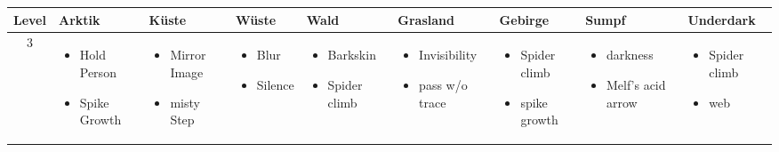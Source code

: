\clearpage
\begin{table}
	\centering
	\begin{tabular}{cp{3cm}p{3cm}p{3cm}p{3cm}p{3cm}p{3cm}p{3cm}p{3cm}}
	\textbf{Level} & \textbf{Arktik} & \textbf{Küste} & \textbf{Wüste} & \textbf{Wald} & \textbf{Grasland} & \textbf{Gebirge} & \textbf{Sumpf} & \textbf{Underdark} \\ \hline
	3 & 
	\begin{itemize}
		\item Hold Person
		\item Spike Growth
	\end{itemize}&
	\begin{itemize}
		\item Mirror Image
		\item misty Step 
	\end{itemize}& 
	\begin{itemize}
		\item Blur
		\item Silence
	\end{itemize}&
	\begin{itemize}
		\item Barkskin
		\item Spider climb
	\end{itemize}&
	\begin{itemize}
		\item Invisibility
		\item pass w/o trace
	\end{itemize}&
	\begin{itemize}
		\item Spider climb
		\item spike growth
	\end{itemize}&
	\begin{itemize}
		\item darkness
		\item Melf's acid arrow
	\end{itemize}&
	\begin{itemize}
		\item Spider climb
		\item web
	\end{itemize}\\ \hline
	

\end{tabular}
\end{table}
